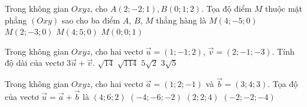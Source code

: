 \begin{ex}%
Trong không gian $Oxyz$, cho $A(2;-2;1), B(0;1;2)$. Tọa độ điểm $M$ thuộc mặt phẳng $(Oxy)$ sao cho ba điểm $A$, $B$, $M$ thẳng hàng là
	\choice
	{\True $M(4;-5;0)$}
	{$M(2;-3;0)$}
	{$M(4;5;0)$}
	{$M(0;0;1)$}
\end{ex}

\begin{ex}%
	Trong không gian $Oxyz$, cho hai vectơ $\overrightarrow{u}=(1;-1;2)$, $\overrightarrow{v}=(2;-1;-3)$. Tính độ dài của vectơ $3\overrightarrow{u}+\overrightarrow{v}$.
	\choice
	{$\sqrt{14}$}
	{$\sqrt{114}$}
	{\True $5\sqrt{2}$}
	{$3\sqrt{5}$}
\end{ex}

\begin{ex}%
	Trong không gian $Oxyz$, cho hai vectơ $\overrightarrow{a}=(1;2;-1)$ và $\overrightarrow{b}=(3;4;3)$. Tọa độ của vectơ $\overrightarrow{u}=\overrightarrow{a}+\overrightarrow{b}$ là
	\choice
	{\True $(4;6;2)$}
	{$(-4;-6;-2)$}
	{$(2;2;4)$}
	{$(-2;-2;-4)$}
\end{ex}

